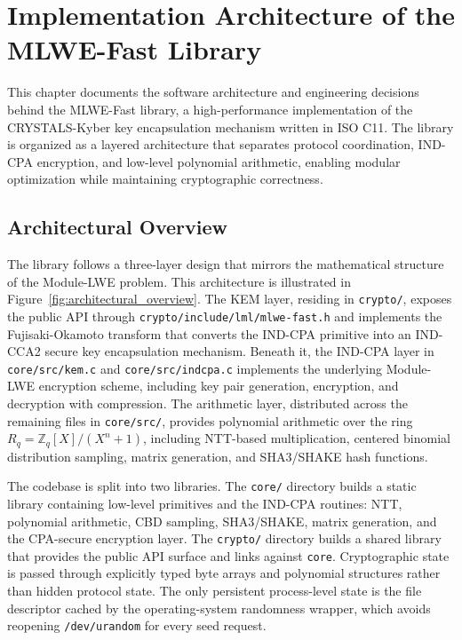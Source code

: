 \chapter{Implementation Architecture of the MLWE-Fast Library}
\label{ch:implementation}

This chapter documents the software architecture and engineering decisions behind the MLWE-Fast library, a high-performance implementation of the CRYSTALS-Kyber key encapsulation mechanism written in ISO C11. The library is organized as a layered architecture that separates protocol coordination, IND-CPA encryption, and low-level polynomial arithmetic, enabling modular optimization while maintaining cryptographic correctness.

\section{Architectural Overview}
\label{sec:arch_overview}

The library follows a three-layer design that mirrors the mathematical structure of the Module-LWE problem. This architecture is illustrated in Figure~\ref{fig:architectural_overview}. The KEM layer, residing in \texttt{crypto/}, exposes the public API through \texttt{crypto/\allowbreak include/\allowbreak lml/\allowbreak mlwe-fast.h} and implements the Fujisaki-Okamoto transform that converts the IND-CPA primitive into an IND-CCA2 secure key encapsulation mechanism. Beneath it, the IND-CPA layer in \texttt{core/\allowbreak src/\allowbreak kem.c} and \texttt{core/\allowbreak src/\allowbreak indcpa.c} implements the underlying Module-LWE encryption scheme, including key pair generation, encryption, and decryption with compression. The arithmetic layer, distributed across the remaining files in \texttt{core/\allowbreak src/}, provides polynomial arithmetic over the ring $R_q = \mathbb{Z}_q[X]/(X^n + 1)$, including NTT-based multiplication, centered binomial distribution sampling, matrix generation, and SHA3\allowbreak/SHAKE hash functions.

The codebase is split into two libraries. The \texttt{core/} directory builds a static library containing low-level primitives and the IND-CPA routines: NTT, polynomial arithmetic, CBD sampling, SHA3/SHAKE, matrix generation, and the CPA-secure encryption layer. The \texttt{crypto/} directory builds a shared library that provides the public API surface and links against \texttt{core}. Cryptographic state is passed through explicitly typed byte arrays and polynomial structures rather than hidden protocol state. The only persistent process-level state is the file descriptor cached by the operating-system randomness wrapper, which avoids reopening \texttt{/dev/urandom} for every seed request.

